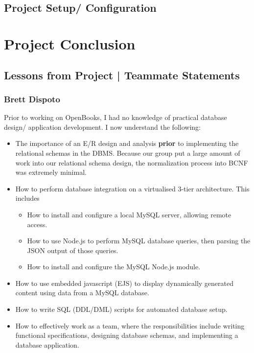 \documentclass[letter, 12pt, titlepage]{article}
\begin{document}
\newpage





\subsection{Project Setup/ Configuration}


\section{Project Conclusion}

\subsection{Lessons from Project | Teammate Statements}

\subsubsection{Brett Dispoto}
Prior to working on OpenBooks, I had no knowledge of practical database design/ application development. I now understand the following:
\begin{itemize}
	\item The importance of an E/R design and analysis \textbf{prior} to implementing the relational schemas in the DBMS. Because our group put a large amount of work into our relational schema design, the normalization process into BCNF was extremely minimal.
	\item How to perform database integration on a virtualised 3-tier architecture. This includes
	      \begin{itemize}
		      \item How to install and configure a local MySQL server, allowing remote access.
		      \item How to use Node.js to perform MySQL database queries, then parsing the JSON output of those queries.
		      \item How to install and configure the MySQL Node.js module.
	      \end{itemize}
	\item How to use embedded javascript (EJS) to display dynamically generated content using data from a MySQL database.
	\item How to write SQL (DDL/DML) scripts for automated database setup.
	\item How to effectively work as a team, where the responsibilities include writing functional specifications,  designing database schemas, and implementing a database application.
\end{itemize}
\end{document}
